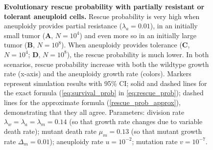 \documentclass[12pt]{extarticle}
\begin{document}
\begin{figure}
\begin{subfigure}{0.5\textwidth}
\end{subfigure}
\caption{
\textbf{Evolutionary rescue probability with partially resistant or tolerant aneuploid cells.}
Rescue probability is very high when aneuploidy provides partial resistance ($\lambda_a=0.01$), in an initially small tumor (\textbf{A}, $N=10^4$) and even more so in an initially large tumor (\textbf{B}, $N=10^8$). 
When aneuploidy provides tolerance (\textbf{C}, $N=10^4$; \textbf{D}, $N=10^8$), the rescue probability is much lower. 
In both scenarios, rescue probability increase with both the wildtype growth rate (x-axis) and the aneuploidy growth rate (colors).
Markers represent simulation results with 95\% CI; solid and dashed lines for the exact formula (\cref{eq:survival_prob} in \cref{eq:rescue_prob}); dashed lines for the approximate formula (\cref{rescue_prob_approx}), demonstrating that they all agree.
Parameters: division rate $\lambda_w=\lambda_a=\lambda_m=0.14$ (so that growth rate changes due to variable death rate); mutant death rate $\mu_m=0.13$ (so that mutant growth rate $\Delta_m=0.01$); aneuploidy rate $u=10^{-2}$; mutation rate $v=10^{-7}$.
}
\label{rescue_prob_wt_growth}
\end{figure}
\end{document}
